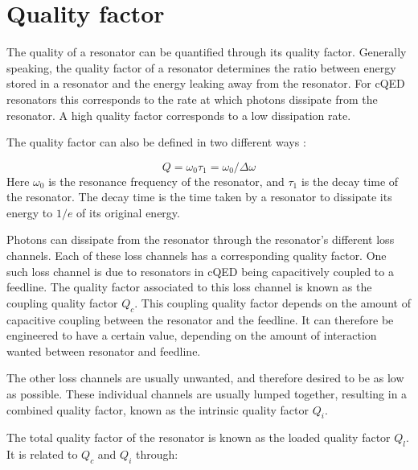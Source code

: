   \section{Quality factor}
    \label{sec:Quality factor}
    The quality of a resonator can be quantified through its quality factor. Generally speaking, the quality factor of a resonator determines the ratio between energy stored in a resonator and the energy leaking away from the resonator. For cQED resonators this corresponds to the rate at which photons dissipate from the resonator. A high quality factor corresponds to a low dissipation rate.

    The quality factor can also be defined in two different ways \cite[pp.23-24]{Mazin}:

    \begin{equation}
        Q = \omega_0 \tau_1 = \omega_0 / \Delta \omega
        \label{eqn:quality factor definition}
    \end{equation}
    Here $\omega_0$ is the resonance frequency of the resonator, and $\tau_1$ is the decay time of the resonator. The decay time is the time taken by a resonator to dissipate its energy to $1/e$ of its original energy.

    Photons can dissipate from the resonator through the resonator's different loss channels. Each of these loss channels has a corresponding quality factor. One such loss channel is due to resonators in cQED being capacitively coupled to a feedline. The quality factor associated to this loss channel is known as the coupling quality factor $Q_c$. This coupling quality factor depends on the amount of capacitive coupling between the resonator and the feedline. It can therefore be engineered to have a certain value, depending on the amount of interaction wanted between resonator and feedline.

    The other loss channels are usually unwanted, and therefore desired to be as low as possible. These individual channels are usually lumped together, resulting in a combined quality factor, known as the intrinsic quality factor $Q_i$.

    The total quality factor of the resonator is known as the loaded quality factor $Q_l$. It is related to $Q_c$ and $Q_i$ through:

